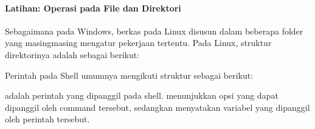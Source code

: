 \documentclass[letterpaper,10pt,english]{sphinxmanual}
\begin{document}
\paragraph{Latihan: Operasi pada File dan Direktori}
\label{\detokenize{sesi1/arsitektur:latihan-operasi-pada-file-dan-direktori}}
Sebagaimana pada Windows, berkas pada Linux disusun dalam beberapa folder yang masing\sphinxhyphen{}masing mengatur pekerjaan tertentu. Pada Linux, struktur direktorinya adalah sebagai berikut:


Perintah pada Shell umumnya mengikuti struktur sebagai berikut:


 adalah perintah yang dipanggil pada shell.  menunjukkan opsi yang dapat dipanggil oleh command tersebut, sedangkan  menyatakan variabel yang dipanggil oleh perintah tersebut.
\end{document}
